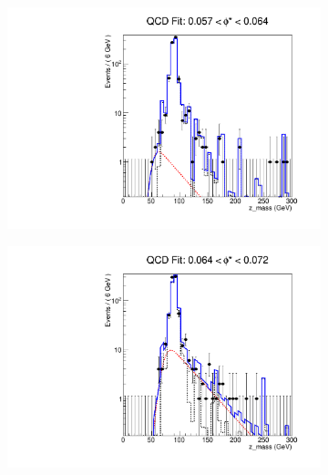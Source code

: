\begin{figure}[!htbp]
    \centering
    \begin{subfigure}[b]{0.5\textwidth}
        \includegraphics[width=\linewidth]{figures/qcd_fits/qcd_fit_plot_for_13.pdf}
        \caption{}
        \label{fig:qcd_fit_13}
    \end{subfigure}%
    \begin{subfigure}[b]{0.5\textwidth}
        \includegraphics[width=\linewidth]{figures/qcd_fits/qcd_fit_plot_for_14.pdf}
        \caption{}
        \label{fig:qcd_fit_14}
    \end{subfigure}
    \begin{subfigure}[b]{0.5\textwidth}

\end{subfigure}
\end{figure}
